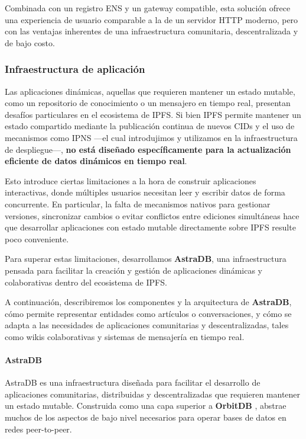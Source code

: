 Combinada con un registro ENS y un gateway compatible, esta solución ofrece una experiencia de usuario comparable a la de un servidor HTTP moderno, pero con las ventajas inherentes de una infraestructura comunitaria, descentralizada y de bajo costo.

\subsubsection{Infraestructura de aplicación}

Las aplicaciones dinámicas, aquellas que requieren mantener un estado mutable, como un repositorio de conocimiento o un mensajero en tiempo real, presentan desafíos particulares en el ecosistema de IPFS. Si bien IPFS permite mantener un estado compartido mediante la publicación continua de nuevos CIDs y el uso de mecanismos como IPNS —el cual introdujimos y utilizamos en la infraestructura de despliegue—, \textbf{no está diseñado específicamente para la actualización eficiente de datos dinámicos en tiempo real}.

Esto introduce ciertas limitaciones a la hora de construir aplicaciones interactivas, donde múltiples usuarios necesitan leer y escribir datos de forma concurrente. En particular, la falta de mecanismos nativos para gestionar versiones, sincronizar cambios o evitar conflictos entre ediciones simultáneas hace que desarrollar aplicaciones con estado mutable directamente sobre IPFS resulte poco conveniente.

Para superar estas limitaciones, desarrollamos \textbf{AstraDB}, una infraestructura pensada para facilitar la creación y gestión de aplicaciones dinámicas y colaborativas dentro del ecosistema de IPFS.

A continuación, describiremos los componentes y la arquitectura de \textbf{AstraDB}, cómo permite representar entidades como artículos o conversaciones, y cómo se adapta a las necesidades de aplicaciones comunitarias y descentralizadas, tales como wikis colaborativas y sistemas de mensajería en tiempo real.

\paragraph{AstraDB}

AstraDB es una infraestructura diseñada para facilitar el desarrollo de aplicaciones comunitarias, distribuidas y descentralizadas que requieren mantener un estado mutable. Construida como una capa superior a \textbf{OrbitDB} \cite{orbitdb}, abstrae muchos de los aspectos de bajo nivel necesarios para operar bases de datos en redes peer-to-peer.

